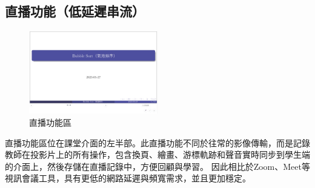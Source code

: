 
\subsection{直播功能（低延遲串流）}

\begin{figure}[H]
  \centering
  \includegraphics[width=0.5\textwidth]{images/streaming.png}
  \caption{直播功能區}
\end{figure}

直播功能區位在課堂介面的左半部。此直播功能不同於往常的影像傳輸，而是記錄教師在投影片上的所有操作，包含換頁、繪畫、游標軌跡和聲音實時同步到學生端的介面上，然後存儲在直播記錄中，方便回顧與學習。
因此相比於Zoom、Meet等視訊會議工具，具有更低的網路延遲與頻寬需求，並且更加穩定。






